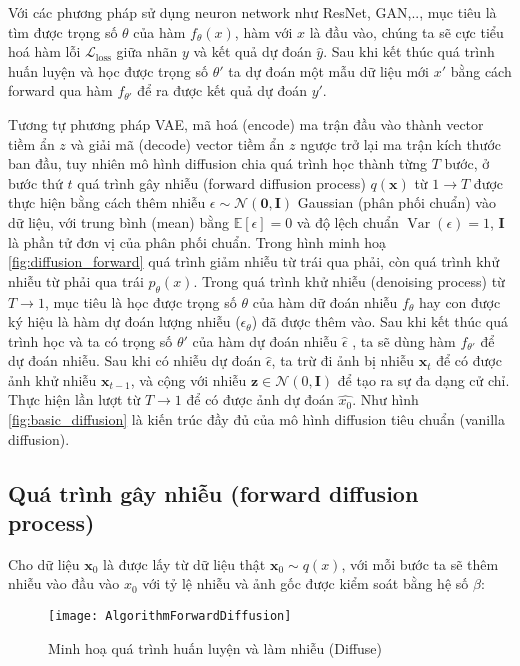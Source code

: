Với các phương pháp sử dụng neuron network như ResNet, GAN,.., mục tiêu là tìm được trọng số $\theta$ của hàm $f_{\theta}(x)$, hàm với $x$ là đầu vào, chúng ta sẽ cực tiểu hoá hàm lỗi $\mathcal{L}_\text{loss}$ giữa nhãn $y$ và kết quả dự đoán $\hat{y}$. Sau khi kết thúc quá trình huấn luyện và học được trọng số $\theta'$ ta dự đoán một mẫu dữ liệu mới $x'$ bằng cách forward qua hàm $f_{\theta'}$ để ra được kết quả dự đoán $y'$.



Tương tự phương pháp VAE, mã hoá (encode) ma trận đầu vào thành vector tiềm ẩn $z$ và giải mã (decode) vector tiềm ẩn $z$ ngược trở lại ma trận kích thước ban đầu, tuy nhiên mô hình diffusion chia quá trình học thành từng $T$ bước, ở bước thứ $t$ quá trình gây nhiễu (forward diffusion process) $q(\mathbf{x})$ từ $1 \to T$ được thực hiện bằng cách thêm nhiễu $\epsilon \sim \mathcal{N} (\mathbf{0}, \mathbf{I})$ Gaussian (phân phối chuẩn) vào dữ liệu, với trung bình  (mean) bằng $\mathbb{E}[\epsilon]=0$ và độ lệch chuẩn $\operatorname{Var}(\epsilon)=1$, $\mathbf{I}$ là phần tử đơn vị của phân phối chuẩn. Trong hình minh hoạ \ref{fig:diffusion_forward} quá trình giảm nhiễu từ trái qua phải, còn quá trình khử nhiễu từ phải qua trái $p_\theta(x)$. Trong quá trình khử nhiễu (denoising process) từ $T \to 1$, mục tiêu là học được trọng số $\theta$ của hàm dữ đoán nhiễu $f_{\theta}$ hay con được ký hiệu là hàm dự đoán lượng nhiễu ($\epsilon_\theta$) đã được thêm vào. Sau khi kết thúc quá trình học và ta có trọng số $\theta'$ của hàm dự đoán nhiễu $\hat{\epsilon}$ , ta sẽ dùng hàm $f_{\theta'}$ để dự đoán nhiễu. Sau khi có nhiễu dự đoán $\hat{\epsilon}$, ta trừ đi ảnh bị nhiễu $\mathbf{x}_{t}$ để có được ảnh khử nhiễu $\mathbf{x}_{t-1}$, và cộng với nhiễu $ \mathbf{z} \in \mathcal{N}(0, \mathbf{I})$ để tạo ra sự đa dạng cử chỉ. Thực hiện lần lượt từ $T \to 1$ để có được ảnh dự đoán $\hat{x_0}$. Như hình \ref{fig:basic_diffusion} là kiến trúc đầy đủ của mô hình diffusion tiêu chuẩn (vanilla diffusion).

\subsection{Quá trình gây nhiễu (forward diffusion process)}

Cho dữ liệu $\mathbf{x}_{0}$ là được lấy từ dữ liệu thật $\mathbf{x}_{0} \sim q(x)$, với mỗi bước ta sẽ thêm nhiễu vào đầu vào $x_{0}$ với tỷ lệ nhiễu và ảnh gốc được kiểm soát bằng hệ số $\beta$:
\vspace{-20pt}
\begin{figure*}
	\centering
	\texttt{[image: AlgorithmForwardDiffusion]}
	\vspace{-5pt}
	\caption{Minh hoạ quá trình huấn luyện và làm nhiễu (Diffuse)}
	\label{fig:AlgorithmForwardDiffusion}
	\vspace{-10pt}
\end{figure*}


